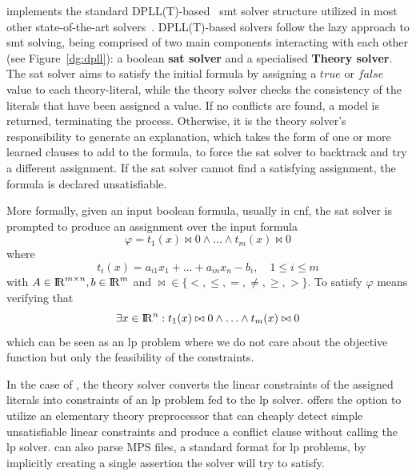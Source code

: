\documentclass[runningheads]{llncs}
\begin{document}
\dlinear implements the standard DPLL(T)-based~\cite{ref:dpll-t} \gls{smt} solver structure utilized in most other state-of-the-art solvers~\cite{ref:z3-dpll-t}.
DPLL(T)-based solvers follow the lazy approach to \gls{smt} solving, being comprised of two main components interacting with each other (see Figure~\ref{dg:dpll}): a boolean \textbf{\gls{sat} solver} and a specialised \textbf{Theory solver}.
The \gls{sat} solver aims to satisfy the initial formula by assigning a $true$ or $false$ value to each theory-literal, while the theory solver checks the consistency of the literals that have been assigned a value.
If no conflicts are found, a model is returned, terminating the process.
Otherwise, it is the theory solver's responsibility to generate an explanation, which takes the form of one or more learned clauses to add to the formula, to force the \gls{sat} solver to backtrack and try a different assignment.
If the \gls{sat} solver cannot find a satisfying assignment, the formula is declared unsatisfiable.


More formally, given an input boolean formula, usually in \gls{cnf}, the \gls{sat} solver is prompted to produce an assignment over the input formula
\begin{equation} %
    \label{eq:smt-formula}
    \varphi = t_1(x) \bowtie 0 \wedge \ldots \wedge t_m (x) \bowtie 0
\end{equation}
where
\begin{equation*}
    t_i(x) = a_{i1}x_1 + \ldots + a_{in}x_n - b_i, \quad 1 \le i \le m
\end{equation*}
with $A \in {\rm I\!R}^{m \times n}, b \in {\rm I\!R}^m$ and $\bowtie \in \{<, \le, =, \ne, \ge, >\}$.
To satisfy $\varphi$ means verifying that
\begin{equation*}
    \exists x \in {\rm I\!R}^n : t_1(x) \bowtie 0 \wedge \ldots \wedge t_m(x) \bowtie 0
\end{equation*}
which can be seen as an \gls{lp} problem where we do not care about the objective function but only the feasibility of the constraints.

In the case of \dlinear, the theory solver converts the linear constraints of the assigned literals into constraints of an \gls{lp} problem fed to the \gls{lp} solver.
\dlinear offers the option to utilize an elementary theory preprocessor that can cheaply detect simple unsatisfiable linear constraints and produce a conflict clause without calling the \gls{lp} solver.
\dlinear can also parse MPS files, a standard format for \gls{lp} problems, by implicitly creating a single assertion the solver will try to satisfy.
\end{document}
